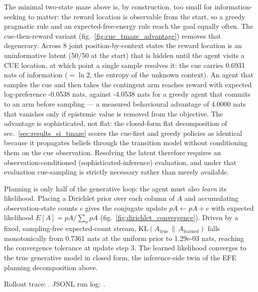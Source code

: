 \documentclass[
  english,
]{article}
\begin{document}
The minimal two-state maze above is, by construction, too small for
information-seeking to matter: the reward location is observable from
the start, so a greedy pragmatic rule and an expected-free-energy rule
reach the goal equally often. The cue-then-reward variant
(fig.~\ref{fig:cue_tmaze_advantage}) removes that degeneracy. Across 8
joint position-by-context states the reward location is an uninformative
latent (50/50 at the start) that is hidden until the agent visits a CUE
location, at which point a single sample resolves it: the cue carries
0.6931 nats of information (\(= \ln 2\), the entropy of the unknown
context). An agent that samples the cue and then takes the contingent
arm reaches reward with expected log-preference -0.0538 nats, against
-4.0538 nats for a greedy agent that commits to an arm before sampling
--- a measured behavioural advantage of 4.0000 nats that vanishes only
if epistemic value is removed from the objective. The advantage is
sophisticated, not flat: the closed-form flat decomposition of
sec.~\ref{sec:results_si_tmaze} scores the cue-first and greedy policies
as identical because it propagates beliefs through the transition model
without conditioning them on the cue observation. Resolving the latent
therefore requires an observation-conditioned (sophisticated-inference)
evaluation, and under that evaluation cue-sampling is strictly necessary
rather than merely available.

Planning is only half of the generative loop: the agent must also
\emph{learn} its likelihood. Placing a Dirichlet prior over each column
of \(A\) and accumulating observation-state counts \(c\) gives the
conjugate update \(pA \leftarrow pA + c\) with expected likelihood
\(E[A] = pA / \sum_o pA\) (fig.~\ref{fig:dirichlet_convergence}). Driven
by a fixed, sampling-free expected-count stream,
\(\mathrm{KL}(A_{\text{true}} \,\|\, A_{\text{learned}})\) falls
monotonically from 0.7361 nats at the uniform prior to 1.29e-03 nats,
reaching the convergence tolerance at update step 3. The learned
likelihood converges to the true generative model in closed form, the
inference-side twin of the EFE planning decomposition above.

Rollout trace: . JSONL run
log: .
\end{document}
